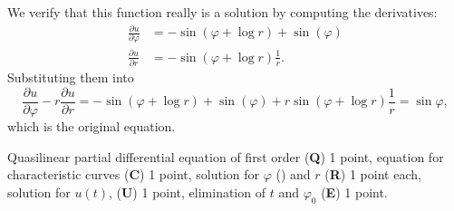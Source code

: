 \begin{loesung}
We verify that this function really is a solution by computing the derivatives:
\begin{align*}
\frac{\partial u}{\partial \varphi}
&=
-\sin(\varphi+\log r)+\sin(\varphi)
\\
\frac{\partial u}{\partial r}
&=
-
\sin(\varphi+\log r)\frac{1}{r}.
\end{align*}
Substituting them into
\[
\frac{\partial u}{\partial \varphi}
-r\frac{\partial u}{\partial r}
=
-\sin(\varphi+\log r)+\sin(\varphi)
+r
\sin(\varphi+\log r)\frac{1}{r}
=
\sin\varphi,
\]
which is the original equation.
\end{loesung}

\begin{bewertung}
Quasilinear partial differential equation of first order ({\bf Q}) 1 point,
equation for characteristic curves ({\bf C}) 1 point,
solution for $\varphi$ ({\bf \textPhi}) and $r$ ({\bf R}) 1 point each,
solution for $u(t)$, ({\bf U}) 1 point,
elimination of $t$ and $\varphi_0$ ({\bf E}) 1 point.
\end{bewertung}

